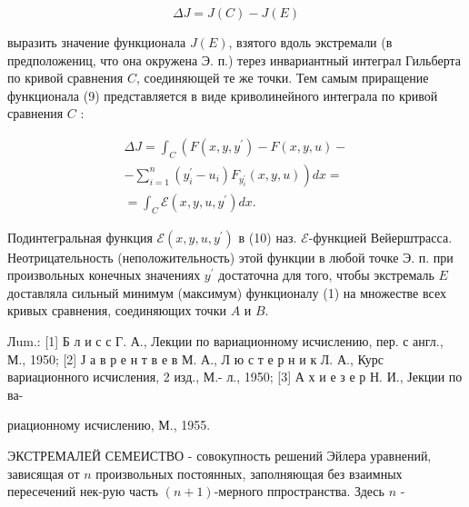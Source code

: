 \documentclass[10pt]{article}
\begin{document}
\[

\Delta J=J(C)-J(E)

\]



выразить значение функционала $J(E)$, взятого вдоль экстремали (в предположениц, что она окружена Э. п.) терез инвариантный интеграл Гильберта по кривой сравнения $C$, соединяющей те же точки. Тем самым приращение функционала (9) представляется в виде криволинейного интеграла по кривой сравнения $C$ :



\[

\begin{gathered}

\Delta J=\int_{C}\left(F\left(x, y, y^{\prime}\right)-F(x, y, u)-\right. \\

\left.-\sum_{i=1}^{n}\left(y_{i}^{\prime}-u_{i}\right) F_{y_{i}^{\prime}}(x, y, u)\right) d x= \\

=\int_{C} \mathscr{E}\left(x, y, u, y^{\prime}\right) d x .

\end{gathered}

\]



Подинтегральная функция $\mathscr{E}\left(x, y, u, y^{\prime}\right)$ в (10) наз. $\mathscr{E}$-функцией Вейерштрасса. Неотрицательность (неположительность) этой функции в любой точке Э. п. при произвольных конечных значениях $y^{\prime}$ достаточна для того, чтобы экстремаль $E$ доставляла сильный минимум (максимум) функционалу (1) на множестве всех кривых сравнения, соединяющих точки $A$ и $B$.



Лum.: [1] Б л и с с Г. А., Лекции по вариационному исчислению, пер. с англ., М., 1950; [2] Ј а в р е н т в е в М. А., Л ю с т е р н и к Л. А., Курс вариационного исчисления, 2 изд., М.- л., 1950; [3] А х и е з е р Н. И., Јекции по ва-

риационному исчислению, М., 1955.



ЭКСТРЕМАЛЕЙ СЕМЕИСТВО - совокупность решений Эйлера уравнений, зависящая от $n$ произвольных постоянных, заполняющая без взаимных пересечений нек-рую часть $(n+1)$-мерного ппространства. Здесь $n$ -
\end{document}
